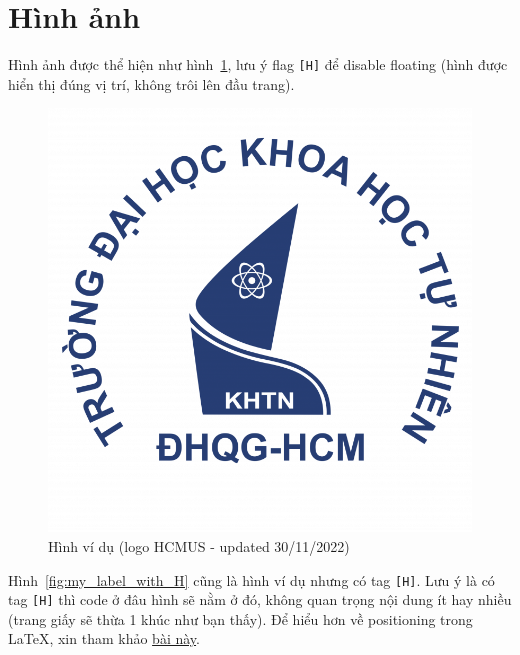 \section{Hình ảnh}
Hình ảnh được thể hiện như hình~\ref{fig:my_label}, lưu ý flag \texttt{[H]} để disable floating (hình được hiển thị đúng vị trí, không trôi lên đầu trang).
\begin{figure}%
\centering
\includegraphics[scale=.4]{img/hcmus-logo.png}
\caption{Hình ví dụ (logo HCMUS - updated 30/11/2022)}
\label{fig:my_label}
\end{figure}

Hình~\ref{fig:my_label_with_H} cũng là hình ví dụ nhưng có tag \texttt{[H]}. Lưu ý là có tag \texttt{[H]} thì code ở đâu hình sẽ nằm ở đó, không quan trọng nội dung ít hay nhiều (trang giấy sẽ thừa 1 khúc như bạn thấy). Để hiểu hơn về positioning trong LaTeX, xin tham khảo \href{https://www.overleaf.com/learn/latex/Positioning_images_and_tables}{bài này}.

